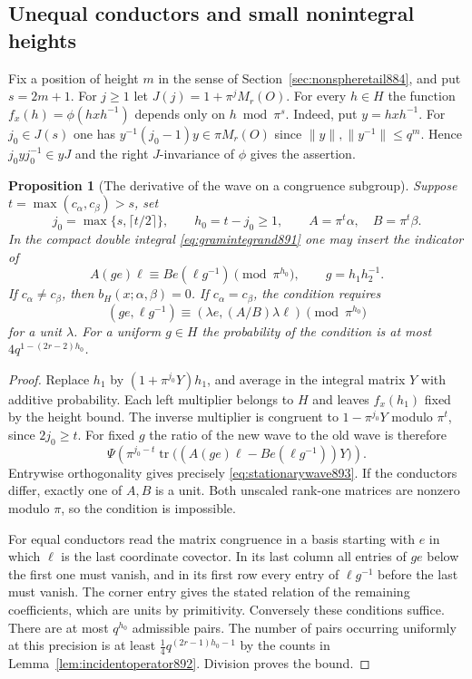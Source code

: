 \documentclass[a4paper,11pt]{article}
\newtheorem{proposition}{Proposition}[section]
\theoremstyle{definition}
\theoremstyle{remark}
\numberwithin{equation}{section}
\begin{document}
\subsection{Unequal conductors and small nonintegral heights}
\label{sec:shallowwave893}

Fix a position of height \(m\) in the sense of
Section~\ref{sec:nonspheretail884}, and put \(s=2m+1\).
For \(j\ge1\) let \(J(j)=1+\pi^j M_r(O)\). For every \(h\in H\)
the function \(f_x(h)=\phi(hxh^{-1})\) depends only on
\(h\bmod\pi^s\). Indeed, put \(y=hxh^{-1}\). For \(j_0\in J(s)\)
one has \(y^{-1}(j_0-1)y\in\pi M_r(O)\) since
\(\|y\|,\|y^{-1}\|\le q^m\). Hence \(j_0 y j_0^{-1}\in yJ\)
and the right \(J\)-invariance of \(\phi\) gives the assertion.

\begin{proposition}[The derivative of the wave on a congruence subgroup]
\leavevmode\label{prop:congruencewave893}
Suppose \(t=\max(c_\alpha,c_\beta)>s\), set
\[
 j_0=\max\{s,\lceil t/2\rceil\},\qquad h_0=t-j_0\ge1,
 \qquad A=\pi^t\alpha,\quad B=\pi^t\beta .
\]
In the compact double integral \eqref{eq:gramintegrand891} one
may insert the indicator of
\begin{equation}
      A(ge)\ell\equiv B e(\ell g^{-1})\pmod{\pi^{h_0}},
                \qquad g=h_1h_2^{-1}.
 \label{eq:stationarywave893}
\end{equation}
If \(c_\alpha\ne c_\beta\), then \(b_H(x;\alpha,\beta)=0\).
If \(c_\alpha=c_\beta\), the condition requires
\[
 (ge,\ell g^{-1})\equiv
          (\lambda e,(A/B)\lambda\ell)\pmod{\pi^{h_0}}
\]
for a unit \(\lambda\). For a uniform \(g\in H\) the probability
of the condition is at most \(4q^{1-(2r-2)h_0}\).
\end{proposition}
\begin{proof}
Replace \(h_1\) by \((1+\pi^{j_0}Y)h_1\), and average in the
integral matrix \(Y\) with additive probability. Each left
multiplier belongs to \(H\) and leaves \(f_x(h_1)\) fixed by the
height bound. The inverse multiplier is congruent to
\(1-\pi^{j_0}Y\) modulo \(\pi^t\), since \(2j_0\ge t\).
For fixed \(g\) the ratio of the new wave to the old wave is
therefore
\[
        \Psi\!\left(\pi^{j_0-t}
                \operatorname{tr}\big((A(ge)\ell-B e(\ell g^{-1}))Y\big)
              \right).
\]
Entrywise orthogonality gives precisely
\eqref{eq:stationarywave893}. If the conductors differ, exactly
one of \(A,B\) is a unit. Both unscaled rank-one matrices are
nonzero modulo \(\pi\), so the condition is impossible.

For equal conductors read the matrix congruence in a basis
starting with \(e\) in which \(\ell\) is the last coordinate
covector. In its last column all entries of \(ge\) below the
first one must vanish, and in its first row every entry of
\(\ell g^{-1}\) before the last must vanish. The corner entry
gives the stated relation of the remaining coefficients, which
are units by primitivity. Conversely these conditions suffice.
There are at most \(q^{h_0}\) admissible pairs. The number of
pairs occurring uniformly at this precision is at least
\(\tfrac14 q^{(2r-1)h_0-1}\) by the counts in
Lemma~\ref{lem:incidentoperator892}. Division proves the bound.
\end{proof}
\end{document}
